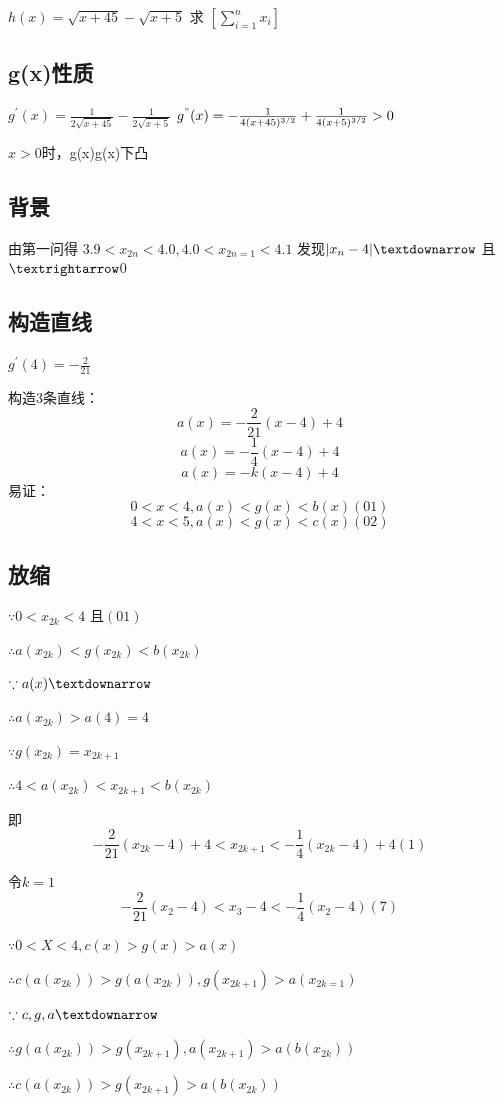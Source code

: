 \documentclass[10pt,a4paper]{article}
\newcommand{\geh}[1]{\sqrt{#1}}
\newcommand{\hs}[2]{#1(#2)}
\newcommand{\sigm}[2]{\sum^{#2}_{i=#1}}
\newcommand{\xiab}[1]{_{#1}}
\newcommand{\p}[2]{#1^{'}(#2)}
\newcommand{\pp}[2]{#1^{"}(#2)}
\newcommand{\so}{\therefore}
\newcommand{\be}{\because}
\begin{document}
$	\hs{h}{x}=\geh{x+45}-\geh{x+5}$
求 $[\sigm{1}{n}x\xiab{i}]$

\subsection*{g(x)性质}

$\p{g}{x}=\frac{1}{2\geh{x+45}}-\frac{1}{2\geh{x+5}}$
$\pp{g}{x}=- \frac{1}{4(x+45)^{3/2}} + \frac{1}{4(x+5)^{3/2}}>0$

$x>0$时，g(x)\textuparrow g(x)下凸

\subsection*{背景}
由第一问得 $3.9<x\xiab{2n}<4.0
 ,  4.0<x\xiab{2n=1}<4.1$
发现$|x\xiab{n}-4|\textdownarrow$ 且 $\textrightarrow $0
\subsection*{构造直线}
$\p{g}{4}=-\frac{2}{21}$

构造3条直线：
$$\hs{a}{x}=-\frac{2}{21}(x-4)+4$$
$$\hs{a}{x}=-\frac{1}{4}(x-4)+4$$
$$\hs{a}{x}=-k(x-4)+4$$
易证：$$0<x<4,a(x)<g(x)<b(x)   (01)$$
$$4<x<5,a(x)<g(x)<c(x)           (02)$$
\subsection*{放缩}

$\because 0<x\xiab{2k}<4$ 且$ (01)$

$\therefore a(x_{2k})<g(x_{2k})<b(x_{2k})$

$\because a(x)\textdownarrow$

$\so a(x_{2k})>a(4)=4$

$\be g(x_{2k})=x_{2k+1}$

$\so 4<a(x\xiab{2k})<x_{2k+1}<b(x\xiab{2k})$

即$$-\frac{2}{21}(x_{2k}-4)+4<x_{2k+1}<-\frac{1}{4}(x_{2k}-4)+4     (1)$$

令$k=1$ $$-\frac{2}{21}(x_{2}-4)<x_{3}-4<-\frac{1}{4}(x_{2}-4)    (7)$$


$
\be 0<X<4,c(x)>g(x)>a(x)$

$\so c(a(x_{2k}))>g(a(x_{2k})) ,  g(x_{2k+1})>a(x\xiab{2k=1})$

$\be c,g,a\textdownarrow$

$\so g(a(x_{2k}))>
g(x_{2k+1}),a(x\xiab{2k+1})>a(b(x\xiab{2k}))
$

$\so c(a(x_{2k}))>g(x_{2k+1})>a(b(x\xiab{2k}))$
\end{document}
